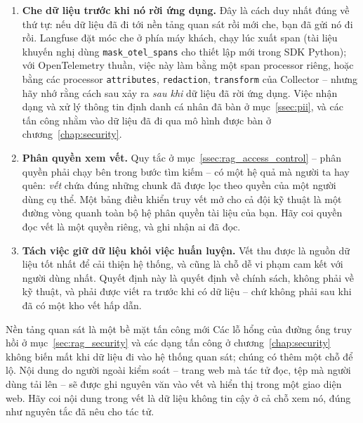 \begin{enumerate}
	\item \textbf{Che dữ liệu trước khi nó rời ứng dụng.} Đây là cách duy nhất đúng về thứ tự: nếu dữ liệu đã đi tới nền tảng quan sát rồi mới che, bạn đã gửi nó đi rồi. Langfuse đặt móc che ở phía máy khách, chạy lúc xuất span (tài liệu khuyến nghị dùng \texttt{mask\_otel\_spans} cho thiết lập mới trong SDK Python); với OpenTelemetry thuần, việc này làm bằng một span processor riêng, hoặc bằng các processor \texttt{attributes}, \texttt{redaction}, \texttt{transform} của Collector -- nhưng hãy nhớ rằng cách sau xảy ra \emph{sau khi} dữ liệu đã rời ứng dụng. Việc nhận dạng và xử lý thông tin định danh cá nhân đã bàn ở mục~\ref{ssec:pii}, và các tấn công nhằm vào dữ liệu đã đi qua mô hình được bàn ở chương~\ref{chap:security}.
	\item \textbf{Phân quyền xem vết.} Quy tắc ở mục~\ref{ssec:rag_access_control} -- phân quyền phải chạy bên trong bước tìm kiếm -- có một hệ quả mà người ta hay quên: \emph{vết} chứa đúng những chunk đã được lọc theo quyền của một người dùng cụ thể. Một bảng điều khiển truy vết mở cho cả đội kỹ thuật là một đường vòng quanh toàn bộ hệ phân quyền tài liệu của bạn. Hãy coi quyền đọc vết là một quyền riêng, và ghi nhận ai đã đọc.
	\item \textbf{Tách việc giữ dữ liệu khỏi việc huấn luyện.} Vết thu được là nguồn dữ liệu tốt nhất để cải thiện hệ thống, và cũng là chỗ dễ vi phạm cam kết với người dùng nhất. Quyết định này là quyết định về chính sách, không phải về kỹ thuật, và phải được viết ra trước khi có dữ liệu -- chứ không phải sau khi đã có một kho vết hấp dẫn.
\end{enumerate}

\begin{pitfall}{Nền tảng quan sát là một bề mặt tấn công mới}
Các lỗ hổng của đường ống truy hồi ở mục~\ref{sec:rag_security} và các dạng tấn công ở chương~\ref{chap:security} không biến mất khi dữ liệu đi vào hệ thống quan sát; chúng có thêm một chỗ để lộ. Nội dung do người ngoài kiểm soát -- trang web mà tác tử đọc, tệp mà người dùng tải lên -- sẽ được ghi nguyên văn vào vết và hiển thị trong một giao diện web. Hãy coi nội dung trong vết là dữ liệu không tin cậy ở cả chỗ xem nó, đúng như nguyên tắc đã nêu cho tác tử.
\end{pitfall}
